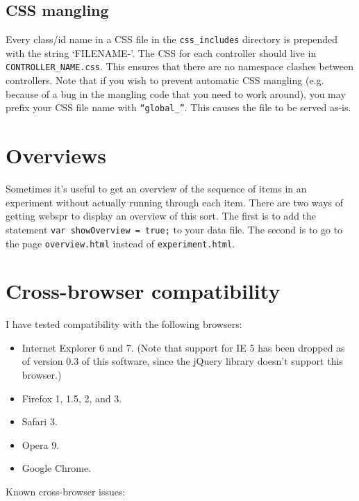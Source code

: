 \documentclass[11pt,letterpaper]{article}
\begin{document}
\subsection{CSS mangling}

Every class/id name in a CSS file in the \texttt{css\_includes} directory is prepended
with the string `FILENAME-'. The CSS for each controller should live in \texttt{CONTROLLER\_NAME.css}.
This ensures that there are no namespace
clashes between controllers. Note that if you wish to prevent automatic CSS mangling (e.g. because
of a bug in the mangling code that you need to work around),
you may prefix your CSS file name with \texttt{``global\_''}. This causes the file to
be served as-is.

\section{Overviews}

Sometimes it's useful to get an overview of the sequence of items in an
experiment without actually running through each item. There are two ways of
getting webspr to display an overview of this sort. The first is to add the
statement \texttt{var showOverview = true;} to your data file.  The second is
to go to the page \texttt{overview.html} instead of \texttt{experiment.html}.

\section{Cross-browser compatibility}

I have tested compatibility with the following browsers:

\begin{itemize}

\item
 Internet Explorer 6 and 7. (Note that support for IE 5 has been dropped as of version 0.3 of this software, since the jQuery library doesn't support this browser.)
\item
 Firefox 1, 1.5, 2, and 3.
\item
 Safari 3.
\item
 Opera 9.
\item
 Google Chrome.
\end{itemize}
Known cross-browser issues:
\end{document}
